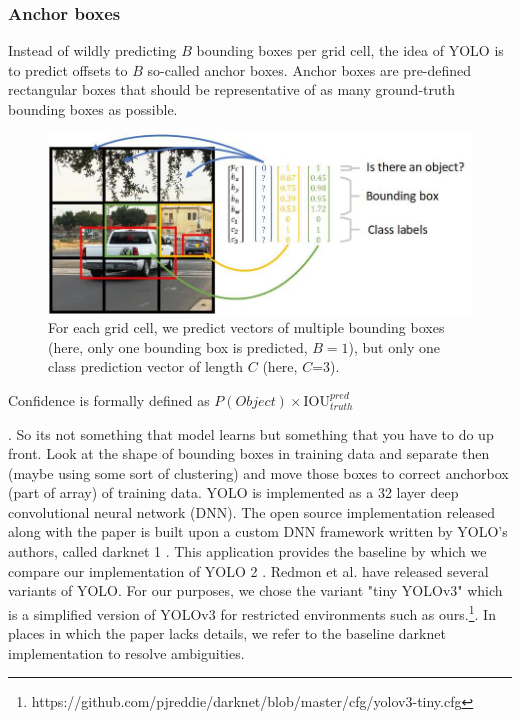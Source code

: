 \documentclass[a4paper]{article}
\begin{document}
\subsubsection*{Anchor boxes}
Instead of wildly predicting $B$ bounding boxes per grid cell, the idea of YOLO is to predict offsets to $B$ so-called anchor boxes. Anchor boxes are pre-defined rectangular boxes that should be representative of as many ground-truth bounding boxes as possible.
\begin{figure}
\includegraphics[scale=0.35]{yolo_mechanics}
\caption{For each grid cell, we predict vectors of multiple bounding boxes (here, only one bounding box is predicted, $B=1$), but only one class prediction vector of length $C$ (here, $C$=3).}

\end{figure}
Confidence is formally defined as $P(Object) \times \text{IOU}^{pred}_{truth}$

. So its not something that model learns but something that you have to do up front. Look at the shape of bounding boxes in training data and separate then (maybe using some sort of clustering) and move those boxes to correct anchorbox (part of array) of training data.
YOLO is implemented as a 32 layer deep convolutional
neural network (DNN). The open source implementation released
along with the paper is built upon a custom DNN
framework written by YOLO’s authors, called darknet 1
.
This application provides the baseline by which we compare
our implementation of YOLO 2
. Redmon et al. have
released several variants of YOLO. For our purposes, we
chose the variant "tiny YOLOv3" which is a simplified version of YOLOv3 for restricted environments such as ours.\footnote{https://github.com/pjreddie/darknet/blob/master/cfg/yolov3-tiny.cfg}. In places in which the paper lacks details, we refer to the baseline darknet implementation
to resolve ambiguities.
\end{document}
